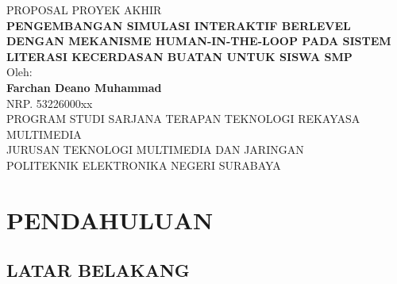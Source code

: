 \documentclass[12pt,a4paper,oneside,openany]{report}
\begin{document}

\begin{titlepage}
\centering
\vspace*{2cm}
{\fontsize{14pt}{16pt}\selectfont PROPOSAL PROYEK AKHIR}\\[1cm]
{\fontsize{14pt}{18pt}\selectfont\bfseries\MakeUppercase{Pengembangan Simulasi Interaktif Berlevel dengan Mekanisme Human-in-the-Loop pada Sistem Literasi Kecerdasan Buatan untuk Siswa SMP}}\\[2cm]
{\fontsize{12pt}{14pt}\selectfont Oleh:}\\[0.3cm]
{\fontsize{12pt}{14pt}\selectfont\bfseries Farchan Deano Muhammad}\\[0.2cm]
{\fontsize{12pt}{14pt}\selectfont NRP. 53226000xx}\\[2cm]
{\fontsize{12pt}{14pt}\selectfont PROGRAM STUDI SARJANA TERAPAN TEKNOLOGI REKAYASA MULTIMEDIA}\\[0.2cm]
{\fontsize{12pt}{14pt}\selectfont JURUSAN TEKNOLOGI MULTIMEDIA DAN JARINGAN}\\[0.2cm]
{\fontsize{12pt}{14pt}\selectfont POLITEKNIK ELEKTRONIKA NEGERI SURABAYA}\\[0.2cm]
{\fontsize{12pt}{14pt}}
\end{titlepage}

\chapter{PENDAHULUAN}
\label{chap:bab1}

\section{LATAR BELAKANG}
\label{sec:latar-belakang}
\end{document}

